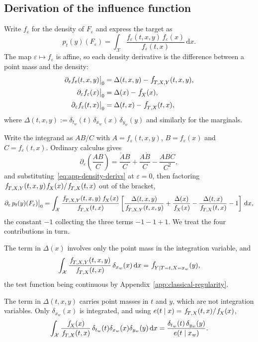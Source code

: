 \documentclass[11pt]{article}
\theoremstyle{plain}
\theoremstyle{definition}
\theoremstyle{remark}
\newcommand{\cX}{\ensuremath{\mathcal{X}}}
\newcommand{\pf}[1]{\ensuremath{\,\mathlarger{\textit{f}}_{#1}}}
\newcommand{\dd}{\,\mathrm{d}}
\newcommand{\gps}{e}
\begin{document}
\subsection{Derivation of the influence function}
\label{app:classical-derivative}

Write $f_\varepsilon$ for the density of $F_\varepsilon$ and express the target as
\[
p_t(y)(F_\varepsilon)
= \int_{\cX} \frac{f_\varepsilon(t,x,y)\,f_\varepsilon(x)}{f_\varepsilon(t,x)} \dd x .
\]
The map $\varepsilon \mapsto f_\varepsilon$ is affine, so each density derivative is the
difference between a point mass and the density:
\begin{equation}
\begin{aligned}
\partial_\varepsilon f_\varepsilon(t,x,y)\big|_{0} &= \Delta(t,x,y) - \pf{T,X,Y}(t,x,y),\\
\partial_\varepsilon f_\varepsilon(x)\big|_{0} &= \Delta(x) - \pf{X}(x),\\
\partial_\varepsilon f_\varepsilon(t,x)\big|_{0} &= \Delta(t,x) - \pf{T,X}(t,x),
\end{aligned}
\label{eq:app-density-derivs}
\end{equation}
where $\Delta(t,x,y) := \delta_{t_w}(t)\,\delta_{x_w}(x)\,\delta_{y_w}(y)$ and similarly
for the marginals.

Write the integrand as $AB/C$ with $A = f_\varepsilon(t,x,y)$, $B = f_\varepsilon(x)$ and
$C = f_\varepsilon(t,x)$. Ordinary calculus gives
\[
\partial_\varepsilon\!\left( \frac{AB}{C} \right)
= \frac{\dot A B}{C} + \frac{A \dot B}{C} - \frac{AB\dot C}{C^2},
\]
and substituting~\eqref{eq:app-density-derivs} at $\varepsilon = 0$, then factoring
$\pf{T,X,Y}(t,x,y)\pf{X}(x)/\pf{T,X}(t,x)$ out of the bracket,
\begin{equation}
\partial_\varepsilon\, p_t(y)(F_\varepsilon)\big|_{0}
= \int_{\cX} \frac{\pf{T,X,Y}(t,x,y)\,\pf{X}(x)}{\pf{T,X}(t,x)}
\left[
\frac{\Delta(t,x,y)}{\pf{T,X,Y}(t,x,y)}
+ \frac{\Delta(x)}{\pf{X}(x)}
- \frac{\Delta(t,x)}{\pf{T,X}(t,x)}
- 1
\right] \dd x ,
\label{eq:app-deriv-general}
\end{equation}
the constant $-1$ collecting the three terms $-1-1+1$. We treat the four contributions in
turn.

The term in $\Delta(x)$ involves only the point mass in the integration variable, and
\[
\int_{\cX} \frac{\pf{T,X,Y}(t,x,y)}{\pf{T,X}(t,x)}\,\delta_{x_w}(x)\dd x
= \pf{Y \mid T=t,X=x_w}(y),
\]
the test function being continuous by Appendix~\ref{app:classical-regularity}.

The term in $\Delta(t,x,y)$ carries point masses in $t$ and $y$, which are not
integration variables. Only $\delta_{x_w}(x)$ is integrated, and using
$\gps(t \mid x) = \pf{T,X}(t,x)/\pf{X}(x)$,
\[
\int_{\cX} \frac{\pf{X}(x)}{\pf{T,X}(t,x)}\,
\delta_{t_w}(t)\delta_{x_w}(x)\delta_{y_w}(y)\dd x
= \frac{\delta_{t_w}(t)\,\delta_{y_w}(y)}{\gps(t \mid x_w)} .
\]
\end{document}
